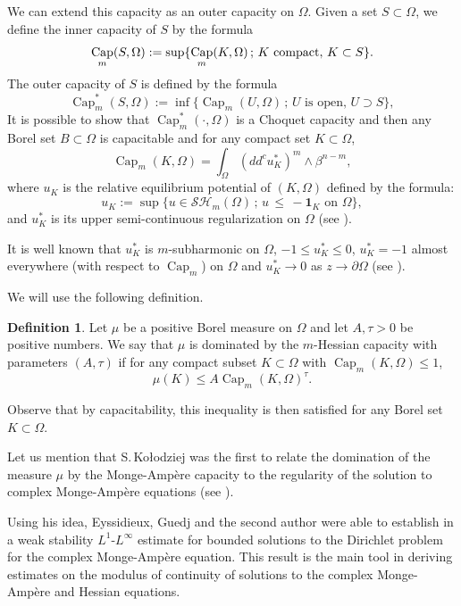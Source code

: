 \documentclass[11pt]{article}
\numberwithin{equation}{section}
\newcommand{\sep}{\,;\,}
\theoremstyle{definition}
\newtheorem{definition}[theorem]{Definition}
\DeclareMathOperator{\Capa}{Cap}
\theoremstyle{plain}
\theoremstyle{definition}
\begin{document}
We can extend this capacity as an outer capacity on $\Omega$. Given a set $S \subset \Omega$, we define the inner capacity of $S$ by the formula
\[
\Capa_m(S,\Omega):= \sup \{\Capa_m(K,\Omega) \sep K \, \, \hbox{compact}, \, K \subset S\}.
\]
The outer capacity of $S$ is defined by the formula
\[
\Capa^*_m(S,\Omega):= \inf \{\Capa_m(U,\Omega) \sep U\text{ is open}, \,U \supset S\},
\]
It is possible to show that $\Capa^*_m(\cdot,\Omega)$ is a Choquet capacity and then any Borel set $ B \subset \Omega$ is capacitable and
for any compact set $K \subset \Omega$,
\begin{equation} \label{eq:cap}
\Capa_m(K,\Omega)=\int_{\Omega}(dd^c u_K^*)^m\wedge\beta^{n-m},
\end{equation}
where $u_K$ is the relative equilibrium potential of $(K,\Omega)$ defined by the formula:
\[
u_K:=\sup\{u\in \mathcal{SH}_m(\Omega) \sep u \, \leq \, -\mathbf{1}_K \text{ on }\Omega\},
\]
and $u_K^*$ is its upper semi-continuous regularization on $\Omega$ (see \cite{Lu12}).

It is well known that $u_K^*$ is $m$-subharmonic on $\Omega$, $- 1 \leq u_K^* \leq 0$, $u_K^*= - 1$ almost everywhere (with respect to $\Capa_m$) on $\Omega$ and $u_K^* \to 0$ as $z \to \partial \Omega$ (see \cite{Lu12}).

We will use the following definition.
\begin{definition} \label{def:cap-domination} Let $\mu$ be a positive Borel measure on $\Omega$ and let $A,\tau > 0$ be positive numbers. We say that $\mu$ is dominated by the $m$-Hessian capacity with parameters $(A,\tau)$ if for any compact subset $K \subset \Omega$ with $\Capa_m (K,\Omega) \leq 1$,
\begin{equation} \label{eq:capdomination}
\mu (K) \leq A \Capa_m (K,\Omega)^{\tau}.
\end{equation}
\end{definition}
Observe that by capacitability, this inequality is then satisfied for any Borel set $K \subset \Omega$.

Let us mention that S.\,Ko\l odziej was the first to relate the domination of the measure $\mu$ by the Monge-Ampère capacity to the regularity of the solution to complex Monge-Ampère equations (see \cite{Kol96}).

Using his idea, Eyssidieux, Guedj and the second author were able to establish in \cite{EGZ09} a weak stability $L^1$-$L^{\infty}$ estimate for bounded solutions to the Dirichlet problem for the complex Monge-Ampère equation. This result is the main tool in deriving estimates on the modulus of continuity of solutions to the complex Monge-Ampère and Hessian equations.
\end{document}
